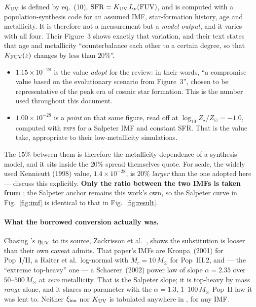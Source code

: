 \documentclass[11pt,a4paper]{article}
\begin{document}
$K_{\rm UV}$ is defined by \cite{md14} eq.~(10), ${\rm SFR} = K_{\rm UV}\,
L_\nu({\rm FUV})$, and is computed with a population-synthesis code for an
assumed IMF, star-formation history, age and metallicity. It is therefore not a
measurement but a \emph{model output}, and it varies with all four. Their
Figure~3 shows exactly that variation, and their text states that age and
metallicity ``counterbalance each other to a certain degree, so that
$K_{\rm FUV}(z)$ changes by less than $20\%$''.
\begin{itemize}\itemsep2pt
\item \textbf{$1.15\times10^{-28}$} is the value \cite{md14} \emph{adopt} for
      the review: in their words, ``a compromise value based on the
      evolutionary scenario from Figure~3'', chosen to be representative of the
      peak era of cosmic star formation. This is the number used throughout
      this document.
\item \textbf{$1.00\times10^{-28}$} is a \emph{point} on that same figure, read
      off at $\log_{10}Z_\star/Z_\odot = -1.0$, computed with
      \textsc{fsps} for a Salpeter IMF and constant SFR. That is the value
      \cite{jeong25} take, appropriate to their low-metallicity simulations.
\end{itemize}
The $15\%$ between them is therefore the metallicity dependence of a synthesis
model, and it sits inside the $20\%$ spread \cite{md14} themselves quote. For
scale, the widely used Kennicutt (1998) value, $1.4\times10^{-28}$, is $20\%$
\emph{larger} than the one adopted here --- \cite{md14} discuss this
explicitly. \textbf{Only the ratio between the two IMFs is taken from
\cite{jeong25}}; the Salpeter anchor remains this work's own, so the Salpeter
curve in Fig.~\ref{fig:imf} is identical to that in Fig.~\ref{fig:result}.

\paragraph{What the borrowed conversion actually was.} Chasing
\cite{jeong25}'s $\eta_{\rm UV}$ to its source, Zackrisson et
al.~\cite{zackrisson11}, shows the substitution is looser than their own caveat
admits. That paper's IMFs are Kroupa~(2001) for Pop~I/II, a Raiter et al.\
log-normal with $M_c = 10\,M_\odot$ for Pop~III.2, and --- the ``extreme
top-heavy'' one --- a Schaerer~(2002) power law of slope
$\alpha = 2.35$ over $50$--$500\,M_\odot$ at \emph{zero} metallicity. That is
the Salpeter slope; it is top-heavy by mass \emph{range} alone, and it shares no
parameter with the $\alpha = 1.3$, $1$--$100\,M_\odot$ Pop~II law it was lent
to. Neither $\xi_{\rm ion}$ nor $K_{\rm UV}$ is tabulated anywhere in
\cite{zackrisson11}, for any IMF.
\end{document}

